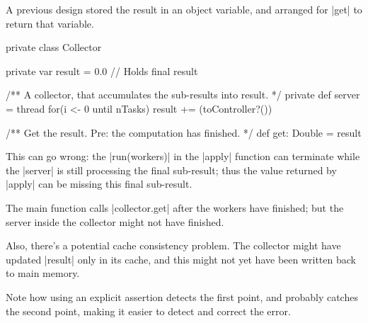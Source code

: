 \begin{slide}

A previous design stored the result in an object variable, and arranged for
|get| to return that variable.
%
\begin{scala}
  private class Collector{
    private var result = 0.0 // Holds final result

    /** A collector, that accumulates the sub-results into result. */
    private def server = thread{
      for(i <- 0 until nTasks) result += (toController?())
    }

    /** Get the result.  Pre: the computation has finished. */
    def get: Double = result
  }
\end{scala}
%
This can go wrong: the |run(workers)| in the |apply| function can terminate
while the |server| is still processing the final sub-result; thus the value
returned by |apply| can be missing this final sub-result.
\end{slide}


\begin{selfnote}
The main function calls |collector.get| after the workers have finished; but
the server inside the collector might not have finished.

Also, there's a potential cache consistency problem.  The collector might have
updated |result| only in its cache, and this might not yet have been written
back to main memory.

Note how using an explicit assertion detects the first point, and probably
catches the second point, making it easier to detect and correct the error.
\end{selfnote}







